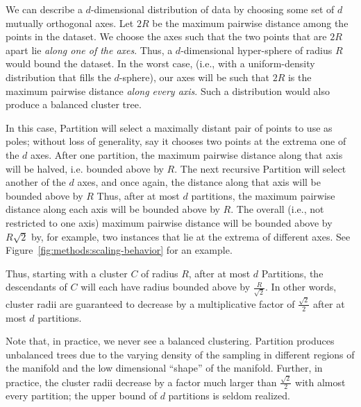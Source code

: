 We can describe a $d$-dimensional distribution of data by choosing some set of $d$ mutually orthogonal axes.
Let $2R$ be the maximum pairwise distance among the points in the dataset. 
We choose the axes such that the two points that are $2R$ apart lie \emph{along one of the axes}. 
Thus, a $d$-dimensional hyper-sphere of radius $R$ would bound the dataset. 
In the worst case, (i.e., with a uniform-density distribution that fills the $d$-sphere), our axes will be such that $2R$ is the maximum pairwise distance \emph{along every axis}. 
Such a distribution would also produce a balanced cluster tree.

In this case, Partition will select a maximally distant pair of points to use as poles;
without loss of generality, say it chooses two points at the extrema one of the $d$ axes. 
After one partition, the maximum pairwise distance along that axis will be halved, i.e. bounded above by $R$.
The next recursive Partition will select another of the $d$ axes, and once again, the distance along that axis will be bounded above by $R$
Thus, after at most $d$ partitions, the maximum pairwise distance along each axis will be bounded above by $R$. 
The overall (i.e., not restricted to one axis) maximum pairwise distance 
will be bounded above by $R\sqrt{2}$ by, for example, two instances that lie at the extrema of different axes. 
See Figure~\ref{fig:methods:scaling-behavior} for an example.

Thus, starting with a cluster $C$ of radius $R$, after at most $d$ Partitions, the descendants of $C$ will each have radius
bounded above by $\frac{R}{\sqrt{2}}$. In other words, cluster radii are guaranteed to decrease by a multiplicative factor of $\frac{\sqrt{2}}{2}$ after at 
most $d$ partitions. 

Note that, in practice, we never see a balanced clustering.
Partition produces unbalanced trees due to the varying density of the sampling in different regions of the manifold and the low dimensional ``shape'' of the manifold.
Further, in practice, the cluster radii decrease by a factor much larger than $\frac{\sqrt{2}}{2}$ with almost every partition;
the upper bound of $d$ partitions is seldom realized. 

